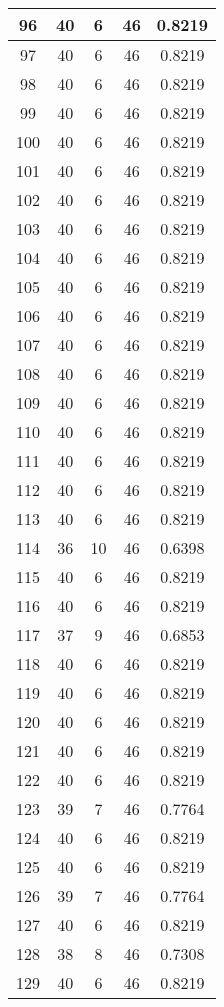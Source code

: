\documentclass[letterpaper, 12pt]{article}
\begin{document}
\begin{longtable}{|c|c|c|c|c|}
\hline
96 & 40 & 6 & 46 & 0.8219 \\
\hline
97 & 40 & 6 & 46 & 0.8219 \\
\hline
98 & 40 & 6 & 46 & 0.8219 \\
\hline
99 & 40 & 6 & 46 & 0.8219 \\
\hline
100 & 40 & 6 & 46 & 0.8219 \\
\hline
101 & 40 & 6 & 46 & 0.8219 \\
\hline
102 & 40 & 6 & 46 & 0.8219 \\
\hline
103 & 40 & 6 & 46 & 0.8219 \\
\hline
104 & 40 & 6 & 46 & 0.8219 \\
\hline
105 & 40 & 6 & 46 & 0.8219 \\
\hline
106 & 40 & 6 & 46 & 0.8219 \\
\hline
107 & 40 & 6 & 46 & 0.8219 \\
\hline
108 & 40 & 6 & 46 & 0.8219 \\
\hline
109 & 40 & 6 & 46 & 0.8219 \\
\hline
110 & 40 & 6 & 46 & 0.8219 \\
\hline
111 & 40 & 6 & 46 & 0.8219 \\
\hline
112 & 40 & 6 & 46 & 0.8219 \\
\hline
113 & 40 & 6 & 46 & 0.8219 \\
\hline
114 & 36 & 10 & 46 & 0.6398 \\
\hline
115 & 40 & 6 & 46 & 0.8219 \\
\hline
116 & 40 & 6 & 46 & 0.8219 \\
\hline
117 & 37 & 9 & 46 & 0.6853 \\
\hline
118 & 40 & 6 & 46 & 0.8219 \\
\hline
119 & 40 & 6 & 46 & 0.8219 \\
\hline
120 & 40 & 6 & 46 & 0.8219 \\
\hline
121 & 40 & 6 & 46 & 0.8219 \\
\hline
122 & 40 & 6 & 46 & 0.8219 \\
\hline
123 & 39 & 7 & 46 & 0.7764 \\
\hline
124 & 40 & 6 & 46 & 0.8219 \\
\hline
125 & 40 & 6 & 46 & 0.8219 \\
\hline
126 & 39 & 7 & 46 & 0.7764 \\
\hline
127 & 40 & 6 & 46 & 0.8219 \\
\hline
128 & 38 & 8 & 46 & 0.7308 \\
\hline
129 & 40 & 6 & 46 & 0.8219 \\

\end{longtable}
\end{document}

